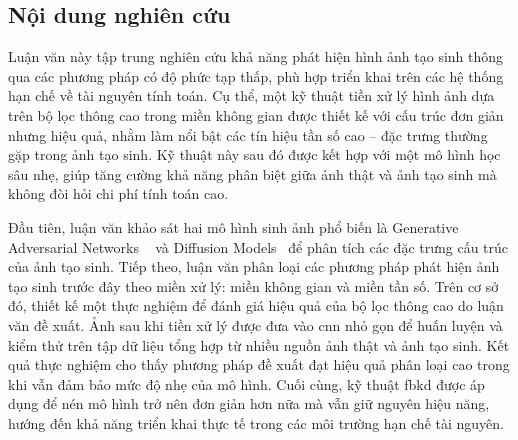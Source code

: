 \subsection{Nội dung nghiên cứu}
%
%

Luận văn này tập trung nghiên cứu khả năng phát hiện hình ảnh tạo sinh thông qua các phương pháp có độ phức tạp thấp, phù hợp triển khai trên các hệ thống hạn chế về tài nguyên tính toán. Cụ thể, một kỹ thuật tiền xử lý hình ảnh dựa trên bộ lọc thông cao trong miền không gian được thiết kế với cấu trúc đơn giản nhưng hiệu quả, nhằm làm nổi bật các tín hiệu tần số cao – đặc trưng thường gặp trong ảnh tạo sinh. Kỹ thuật này sau đó được kết hợp với một mô hình học sâu nhẹ, giúp tăng cường khả năng phân biệt giữa ảnh thật và ảnh tạo sinh mà không đòi hỏi chi phí tính toán cao. 

Đầu tiên, luận văn khảo sát hai mô hình sinh ảnh phổ biến là Generative Adversarial Networks ~\cite{Goodfellow2014GenerativeAN} và Diffusion Models~\cite{Ho2020DenoisingDP} để phân tích các đặc trưng cấu trúc của ảnh tạo sinh.
%
Tiếp theo, luận văn phân loại các phương pháp phát hiện ảnh tạo sinh trước đây theo miền xử lý: miền không gian và miền tần số.
%
Trên cơ sở đó, thiết kế một thực nghiệm để đánh giá hiệu quả của bộ lọc thông cao do luận văn đề xuất. Ảnh sau khi tiền xử lý được đưa vào \gls{cnn} nhỏ gọn để huấn luyện và kiểm thử trên tập dữ liệu tổng hợp từ nhiều nguồn ảnh thật và ảnh tạo sinh. Kết quả thực nghiệm cho thấy phương pháp đề xuất đạt hiệu quả phân loại cao trong khi vẫn đảm bảo mức độ nhẹ của mô hình. Cuối cùng, kỹ thuật \gls{fbkd} được áp dụng để nén mô hình trở nên đơn giản hơn nữa mà vẫn giữ nguyên hiệu năng, hướng đến khả năng triển khai thực tế trong các môi trường hạn chế tài nguyên.

